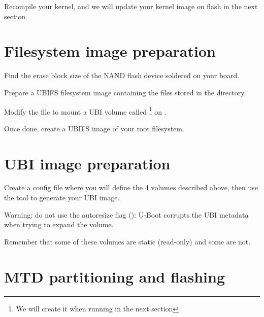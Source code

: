 Recompile your kernel, and we will update your kernel image on flash
in the next section.

\section{Filesystem image preparation}

Find the erase block size of the NAND flash device soldered on your
board.

Prepare a UBIFS filesystem image containing the files stored in the
 directory.

Modify the  file to mount a UBI volume called
 \footnote{We will create it when running 
in the next section} on .

Once done, create a UBIFS image of your root filesystem.

\section{UBI image preparation}

Create a  config file where you will define the 4 volumes
described above, then use the  tool to generate your
UBI image.

Warning: do not use the autoresize flag ():
U-Boot corrupts the UBI metadata when trying to expand the volume.

Remember that some of these volumes are static (read-only) and some are
not.

%
%

%
%
%
%
%
%

%
%
%

\section{MTD partitioning and flashing}

